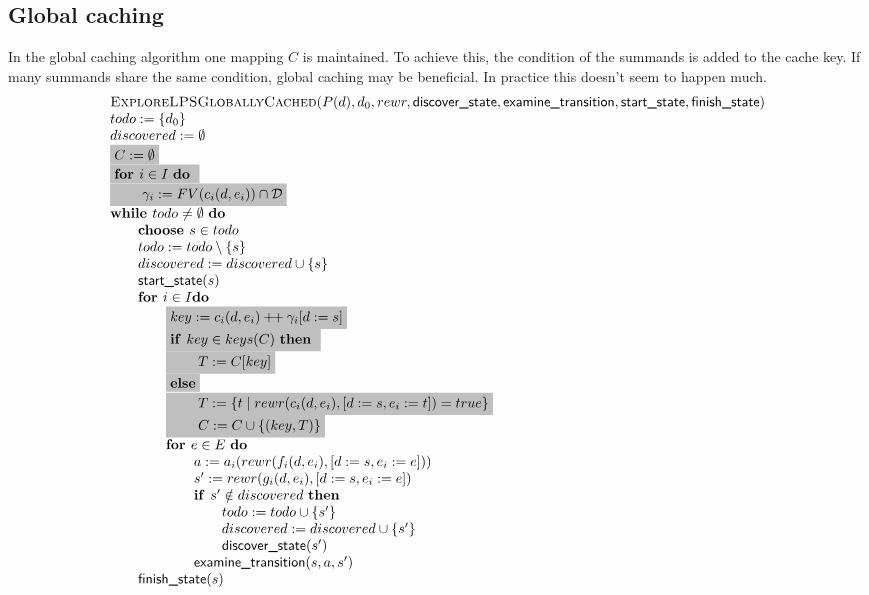 \documentclass{article}
\newcommand{\concat}{\ensuremath{+\!\!+\:}}
\newcommand{\Space}{\text{\ }}
\newcommand{\If}{\text{\textbf{if }}}
\newcommand{\Do}{\text{\textbf{do }}}
\newcommand{\Then}{\text{\textbf{then }}}
\newcommand{\For}{\text{\textbf{for }}}
\newcommand{\While}{\text{\textbf{while }}}
\newcommand{\Choose}{\text{\textbf{choose }}}
\begin{document}
\subsection{Global caching}
In the global caching algorithm one mapping $C$ is maintained. To achieve this, the condition of the summands is added to the cache key. If many summands share the same condition, global caching may be beneficial. In practice this doesn't seem to happen much.
\[
\begin{tabular}{l}
\textsc{ExploreLPSGloballyCached}($P(d), d_0, rewr, \textsf{discover\_state}, \textsf{examine\_transition},
\textsf{start\_state}, \textsf{finish\_state})$ \\
$todo := \{d_0\}$ \\
$discovered := \emptyset$ \\
\colorbox{lightgray}{$C := \emptyset$} \\
\colorbox{lightgray}{\For $i \in I$ \Do} \\
\colorbox{lightgray}{\qquad $\gamma_i := FV(c_i(d, e_i)) \cap \mathcal{D}$} \\
$\While todo \neq \emptyset \Space \Do$ \\
\qquad $\Choose s \in todo$ \\
\qquad $todo := todo \setminus \{s\}$ \\
\qquad $discovered := discovered \cup \{s\}$ \\
\qquad $\textsf{start\_state}(s)$ \\
\qquad $\For i \in I \Do$ \\
\qquad \qquad \colorbox{lightgray}{$key := c_i(d,e_i) \concat \gamma_i[d:=s]$} \\
\qquad \qquad \colorbox{lightgray}{\If $key \in keys(C)$ \Then} \\
\qquad \qquad \colorbox{lightgray}{\qquad $T := C[key]$} \\
\qquad \qquad \colorbox{lightgray}{\textbf{else}} \\
\qquad \qquad \colorbox{lightgray}{\qquad $T := \{ t \mid rewr(c_i(d, e_i), [d:=s,e_i:=t]) = true \}$} \\
\qquad \qquad \colorbox{lightgray}{\qquad $C := C \cup \{(key, T)\}$} \\
\qquad \qquad $\For e \in E  \Space \Do$ \\
\qquad \qquad \qquad $a := a_i(rewr(f_i(d,e_i), [d:=s,e_i:=e]))$ \\
\qquad \qquad \qquad $s' := rewr(g_i(d,e_i), [d:=s,e_i:=e])$ \\
\qquad \qquad \qquad $\If s' \notin discovered \Space \Then$ \\
\qquad \qquad \qquad \qquad $todo := todo \cup \{ s' \}$ \\
\qquad \qquad \qquad \qquad $discovered := discovered \cup \{s'\}$ \\
\qquad \qquad \qquad \qquad $\textsf{discover\_state}(s')$ \\
\qquad \qquad \qquad $\textsf{examine\_transition}(s, a, s')$ \\
\qquad $\textsf{finish\_state}(s)$
\end{tabular}
\]
\end{document}
